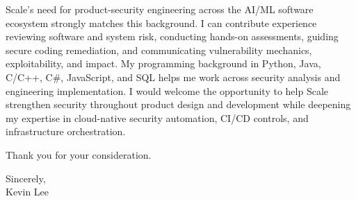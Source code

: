 \documentclass[12pt]{article}
\begin{document}
Scale's need for product-security engineering across the AI/ML software ecosystem strongly matches this background. I can contribute experience reviewing software and system risk, conducting hands-on assessments, guiding secure coding remediation, and communicating vulnerability mechanics, exploitability, and impact. My programming background in Python, Java, C/C++, C\#, JavaScript, and SQL helps me work across security analysis and engineering implementation. I would welcome the opportunity to help Scale strengthen security throughout product design and development while deepening my expertise in cloud-native security automation, CI/CD controls, and infrastructure orchestration.

Thank you for your consideration.

Sincerely,\\
Kevin Lee
\end{document}
